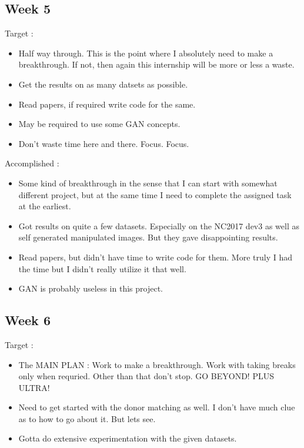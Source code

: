 \documentclass{article}
\begin{document}
\subsection{Week 5}
Target :
\begin{itemize}
\item Half way through. This is the point where I absolutely need to make a breakthrough. If not, then again this internship will be more or less a waste.
\item Get the results on as many datsets as possible.
\item Read papers, if required write code for the same.
\item May be required to use some GAN concepts.
\item Don't waste time here and there. Focus. Focus.
\end{itemize}

Accomplished :
\begin{itemize}
\item Some kind of breakthrough in the sense that I can start with somewhat different project, but at the same time I need to complete the assigned task at the earliest.
\item Got results on quite a few datasets. Especially on the NC2017 dev3 as well as self generated manipulated images. But they gave disappointing results.
\item Read papers, but didn't have time to write code for them. More truly I had the time but I didn't really utilize it that well.
\item GAN is probably useless in this project.
\end{itemize}

\subsection{Week 6}
Target :
\begin{itemize}
\item The MAIN PLAN : Work to make a breakthrough. Work with taking breaks only when requried. Other than that don't stop. GO BEYOND! PLUS ULTRA!
\item Need to get started with the donor matching as well. I don't have much clue as to how to go about it. But lets see.
\item Gotta do extensive experimentation with the given datasets.
\end{itemize}
\end{document}
